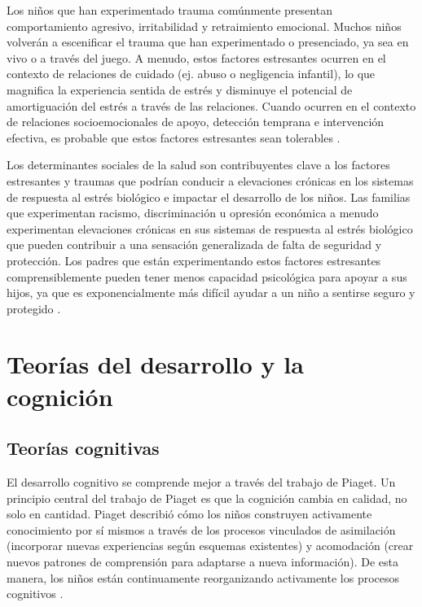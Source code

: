 Los niños que han experimentado trauma comúnmente presentan comportamiento
agresivo, irritabilidad y retraimiento emocional. Muchos niños volverán a
escenificar el trauma que han experimentado o presenciado, ya sea en vivo o a
través del juego. A menudo, estos factores estresantes ocurren en el contexto
de relaciones de cuidado (ej. abuso o negligencia infantil), lo que magnifica la
experiencia sentida de estrés y disminuye el potencial de amortiguación del
estrés a través de las relaciones. Cuando ocurren en el contexto de relaciones
socioemocionales de apoyo, detección temprana e intervención efectiva, es
probable que estos factores estresantes sean tolerables \cite{Feldman3}.

Los determinantes sociales de la salud son contribuyentes clave a los factores
estresantes y traumas que podrían conducir a elevaciones crónicas en los
sistemas de respuesta al estrés biológico e impactar el desarrollo de los
niños. Las familias que experimentan racismo, discriminación u opresión
económica a menudo experimentan elevaciones crónicas en sus sistemas de
respuesta al estrés biológico que pueden contribuir a una sensación
generalizada de falta de seguridad y protección. Los padres que están
experimentando estos factores estresantes comprensiblemente pueden tener menos
capacidad psicológica para apoyar a sus hijos, ya que es exponencialmente más
difícil ayudar a un niño a sentirse seguro y protegido \cite{Feldman3}.

\section{Teorías del desarrollo y la cognición}
\subsection{Teorías cognitivas}
El desarrollo cognitivo se comprende mejor a través del trabajo de Piaget. Un
principio central del trabajo de Piaget es que la cognición cambia en calidad,
no solo en cantidad. Piaget describió cómo los niños construyen activamente
conocimiento por sí mismos a través de los procesos vinculados de asimilación
(incorporar nuevas experiencias según esquemas existentes) y acomodación (crear
nuevos patrones de comprensión para adaptarse a nueva información). De esta
manera, los niños están continuamente reorganizando activamente los procesos
cognitivos \cite{Nelson19}.

